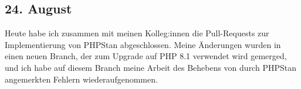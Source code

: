 \subsection{24. August}
Heute habe ich zusammen mit meinen Kolleg:innen die Pull-Requests zur Implementierung von PHPStan abgeschlossen. Meine Änderungen wurden in einen neuen Branch, der zum Upgrade auf PHP 8.1 verwendet wird gemerged, und ich habe auf diesem Branch meine Arbeit des Behebens von durch PHPStan angemerkten Fehlern wiederaufgenommen.